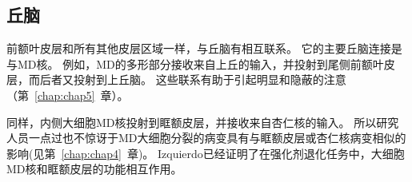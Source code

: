 \subsection{丘脑}
\par

前额叶皮层和所有其他皮层区域一样，与丘脑有相互联系。
它的主要丘脑连接是与MD核。
例如，MD的多形部分接收来自上丘的输入\cite{russchen1987afferent,erickson2004subcortical}，并投射到尾侧前额叶皮层，而后者又投射到上丘脑\cite{fries1984cortical}。
这些联系有助于引起明显和隐蔽的注意（第~\ref{chap:chap5}~章）。
\par


同样，内侧大细胞MD核投射到眶额皮层\cite{ray1993organization}，并接收来自杏仁核的输入\cite{russchen1987afferent}。
所以研究人员一点过也不惊讶于MD大细胞分裂的病变具有与眶额皮层或杏仁核病变相似的影响\cite{mitchell2007neurotoxic}(见第~\ref{chap:chap4}~章)。
Izquierdo\cite{izquierdo2010functional}已经证明了在强化剂退化任务中，大细胞MD核和眶额皮层的功能相互作用。


